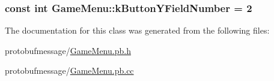 \hypertarget{class_game_menu_ae3096491e0598302630a930f29280b6c}{
\subsubsection[{k\-Button\-Y\-Field\-Number}]{\setlength{\rightskip}{0pt plus 5cm}const int Game\-Menu\-::k\-Button\-Y\-Field\-Number = 2\hspace{0.3cm}{\ttfamily [static]}}}\label{class_game_menu_ae3096491e0598302630a930f29280b6c}


The documentation for this class was generated from the following files\-:\begin{DoxyCompactItemize}
\item 
protobufmessage/\hyperlink{_game_menu_8pb_8h}{Game\-Menu.\-pb.\-h}\item 
protobufmessage/\hyperlink{_game_menu_8pb_8cc}{Game\-Menu.\-pb.\-cc}\end{DoxyCompactItemize}

